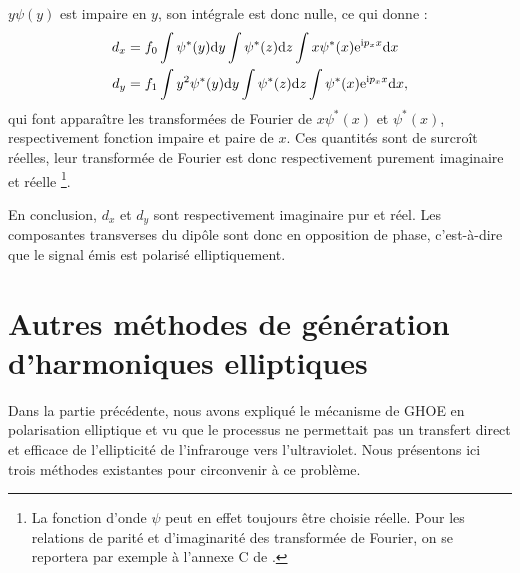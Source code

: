 $y\psi(y)$ est impaire en $y$, son intégrale est donc nulle, ce qui donne :
\begin{align}
d_x &= f_0\int{\psi^*(y)\mathrm{d}y}\int{\psi^*(z)\mathrm{d}z}\int{x\psi^*(x)\mathrm{e}^{\mathrm{i}p_x x}\mathrm{d}x}\nonumber\\
d_y &= f_1\int{y^2 \psi^*(y)\mathrm{d}y}\int{\psi^*(z)\mathrm{d}z}\int{\psi^*(x)\mathrm{e}^{\mathrm{i}p_x x}\mathrm{d}x},
\end{align}
qui font apparaître les transformées de Fourier de $x\psi^*(x)$ et $\psi^*(x)$, respectivement fonction impaire et paire de $x$. Ces quantités sont de surcroît réelles, leur transformée de Fourier est donc respectivement purement imaginaire et réelle \footnote{La fonction d'onde $\psi$ peut en effet toujours être choisie réelle. Pour les relations de parité et d'imaginarité des transformée de Fourier, on se reportera par exemple à l'annexe C de .}.

En conclusion, $d_x$ et $d_y$ sont respectivement imaginaire pur et réel. Les composantes transverses du dipôle sont donc en opposition de phase, c'est-à-dire que le signal émis est polarisé elliptiquement.

\section{Autres méthodes de génération d'harmoniques elliptiques}
Dans la partie précédente, nous avons expliqué le mécanisme de GHOE en polarisation elliptique et vu que le processus ne permettait pas un transfert direct et efficace de l'ellipticité de l'infrarouge vers l'ultraviolet. Nous présentons ici trois méthodes existantes pour circonvenir à ce problème. 

